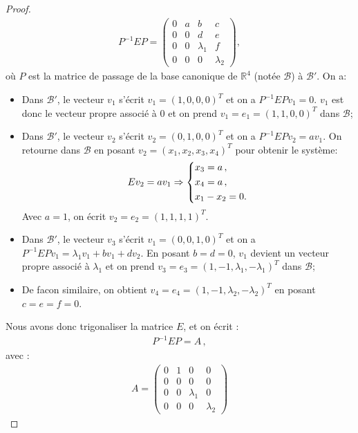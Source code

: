 \begin{proof}
\begin{align}
    P^{-1}EP = \begin{pmatrix}
        0 & a & b & c \\ 0 & 0 & d & e \\ 0 & 0 & \lambda_1 & f \\ 0 & 0 & 0 & \lambda_2
    \end{pmatrix},
\end{align}
où $P$ est la matrice de passage de la base canonique de $\mathbb{R}^4$ (notée $\mathcal{B}$) à $\mathcal{B}'$. On a:
\begin{itemize}
    \item Dans $\mathcal{B}'$, le vecteur $v_1$ s'écrit $v_1 = (1,0,0,0)^T$ et on a $P^{-1}EP v_1 = 0$. $v_1$ est donc le vecteur propre associé à $0$ et on prend $v_1 = e_1 = (1,1,0,0)^T$ dans $\mathcal{B}$;
    \item Dans $\mathcal{B}'$, le vecteur $v_2$ s'écrit $v_2 = (0,1,0,0)^T$ et on a $P^{-1}EP v_2 = a v_1$. On retourne dans $\mathcal{B}$ en posant $v_2 = (x_1, x_2, x_3, x_4)^T$ pour obtenir le système:
    \begin{align*}
        E v_2 = a v_1 \Rightarrow
        \begin{dcases}            
        x_3 = a \,,  \\
        x_4 = a  \,, \\
        x_1 - x_2 = 0.
        \end{dcases}
    \end{align*} 
    Avec $a = 1$, on écrit $v_2 = e_2 = (1,1,1,1)^T$.
    \item Dans $\mathcal{B}'$, le vecteur $v_3$ s'écrit $v_1 = (0,0,1,0)^T$ et on a $P^{-1}EP v_1 = \lambda_1 v_1 + bv_1 + d v_2$. En posant $b=d=0$, $v_1$ devient un vecteur propre associé à $\lambda_1$ et on prend $v_3 = e_3 = (1,-1,\lambda_1,-\lambda_1)^T$ dans $\mathcal{B}$;
    \item De facon similaire, on obtient $v_4 = e_4 = (1,-1,\lambda_2,-\lambda_2)^T$ en posant $c=e=f=0$.
\end{itemize}
Nous avons donc trigonaliser la matrice $E$, et on écrit :
\begin{align}
    P^{-1}EP = A \,,
\end{align}
avec :
\begin{align*}
    A = \begin{pmatrix}
        0 & 1 & 0 & 0 \\ 0 & 0 & 0 & 0 \\ 0 & 0 & \lambda_1 & 0 \\ 0 & 0 & 0 & \lambda_2

\end{pmatrix}
\end{align*}
\end{proof}
